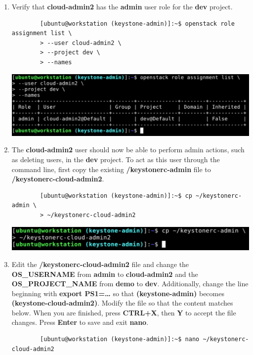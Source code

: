 \documentclass[letterpaper, 12pt]{article}
\begin{document}
\begin{enumerate}
    \item Verify that \textbf{cloud-admin2} has the \textbf{admin} user role for the \textbf{dev} project.
    \begin{lstlisting}
        [ubuntu@workstation (keystone-admin)]:~$ openstack role assignment list \
        > --user cloud-admin2 \
        > --project dev \
        > --names
    \end{lstlisting}

    \begin{center}
        \includegraphics[width=\linewidth]{images/appendix/step3.png}
    \end{center}

    \item The \textbf{cloud-admin2} user should now be able to perform admin actions, such as deleting users, in the \textbf{dev} project.
    To act as this user through the command line, first copy the existing \textbf{\texttildemid/keystonerc-admin} file to \textbf{\texttildemid/keystonerc-cloud-admin2}.
    \begin{lstlisting}
        [ubuntu@workstation (keystone-admin)]:~$ cp ~/keystonerc-admin \
        > ~/keystonerc-cloud-admin2
    \end{lstlisting}

    \begin{center}
        \includegraphics[width=\linewidth]{images/appendix/step4.png}
    \end{center}

    \item Edit the \textbf{\texttildemid/keystonerc-cloud-admin2} file and change the \textbf{OS\_USERNAME} from \textbf{admin} to \textbf{cloud-admin2} and the \textbf{OS\_PROJECT\_NAME} from \textbf{demo} to \textbf{dev}.
    Additionally, change the line beginning with \textbf{export PS1=…} so that \textbf{(keystone-admin)} becomes \textbf{(keystone-cloud-admin2)}.
    Modify the file so that the content matches below.
    When you are finished, press \textbf{CTRL+X}, then \textbf{Y} to accept the file changes.
    Press \textbf{Enter} to save and exit \textbf{nano}.
    \begin{lstlisting}
        [ubuntu@workstation (keystone-admin)]:~$ nano ~/keystonerc-cloud-admin2
    \end{lstlisting}


\end{enumerate}
\end{document}
